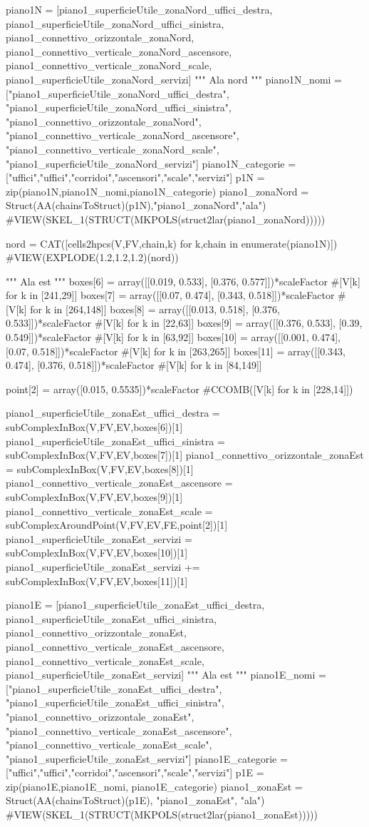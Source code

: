 piano1N = [piano1_superficieUtile_zonaNord_uffici_destra, piano1_superficieUtile_zonaNord_uffici_sinistra, piano1_connettivo_orizzontale_zonaNord, piano1_connettivo_verticale_zonaNord_ascensore, piano1_connettivo_verticale_zonaNord_scale, piano1_superficieUtile_zonaNord_servizi]
""" Ala nord """
piano1N_nomi = ["piano1_superficieUtile_zonaNord_uffici_destra", "piano1_superficieUtile_zonaNord_uffici_sinistra", "piano1_connettivo_orizzontale_zonaNord", "piano1_connettivo_verticale_zonaNord_ascensore", "piano1_connettivo_verticale_zonaNord_scale", "piano1_superficieUtile_zonaNord_servizi"]
piano1N_categorie = ["uffici","uffici","corridoi","ascensori","scale","servizi"]
p1N = zip(piano1N,piano1N_nomi,piano1N_categorie)
piano1_zonaNord = Struct(AA(chainsToStruct)(p1N),"piano1_zonaNord","ala")
#VIEW(SKEL_1(STRUCT(MKPOLS(struct2lar(piano1_zonaNord)))))
    
nord = CAT([cells2hpcs(V,FV,chain,k) for k,chain in enumerate(piano1N)])
#VIEW(EXPLODE(1.2,1.2,1.2)(nord))

""" Ala est """
boxes[6] = array([[0.019, 0.533], [0.376, 0.577]])*scaleFactor #[V[k] for k in [241,29]]
boxes[7] = array([[0.07, 0.474], [0.343, 0.518]])*scaleFactor #[V[k] for k in [264,148]]
boxes[8] = array([[0.013, 0.518], [0.376, 0.533]])*scaleFactor #[V[k] for k in [22,63]]
boxes[9] = array([[0.376, 0.533], [0.39, 0.549]])*scaleFactor #[V[k] for k in [63,92]]
boxes[10] = array([[0.001, 0.474], [0.07, 0.518]])*scaleFactor #[V[k] for k in [263,265]]
boxes[11] = array([[0.343, 0.474], [0.376, 0.518]])*scaleFactor #[V[k] for k in [84,149]]

point[2] = array([0.015, 0.5535])*scaleFactor #CCOMB([V[k] for k in [228,14]])

piano1_superficieUtile_zonaEst_uffici_destra = subComplexInBox(V,FV,EV,boxes[6])[1]
piano1_superficieUtile_zonaEst_uffici_sinistra = subComplexInBox(V,FV,EV,boxes[7])[1]
piano1_connettivo_orizzontale_zonaEst = subComplexInBox(V,FV,EV,boxes[8])[1]
piano1_connettivo_verticale_zonaEst_ascensore = subComplexInBox(V,FV,EV,boxes[9])[1]
piano1_connettivo_verticale_zonaEst_scale = subComplexAroundPoint(V,FV,EV,FE,point[2])[1]
piano1_superficieUtile_zonaEst_servizi = subComplexInBox(V,FV,EV,boxes[10])[1]
piano1_superficieUtile_zonaEst_servizi += subComplexInBox(V,FV,EV,boxes[11])[1]

piano1E = [piano1_superficieUtile_zonaEst_uffici_destra, piano1_superficieUtile_zonaEst_uffici_sinistra, piano1_connettivo_orizzontale_zonaEst, piano1_connettivo_verticale_zonaEst_ascensore, piano1_connettivo_verticale_zonaEst_scale, piano1_superficieUtile_zonaEst_servizi]
""" Ala est """
piano1E_nomi = ["piano1_superficieUtile_zonaEst_uffici_destra", "piano1_superficieUtile_zonaEst_uffici_sinistra", "piano1_connettivo_orizzontale_zonaEst", "piano1_connettivo_verticale_zonaEst_ascensore", "piano1_connettivo_verticale_zonaEst_scale", "piano1_superficieUtile_zonaEst_servizi"]
piano1E_categorie = ["uffici","uffici","corridoi","ascensori","scale","servizi"]
p1E = zip(piano1E,piano1E_nomi, piano1E_categorie)
piano1_zonaEst = Struct(AA(chainsToStruct)(p1E), "piano1_zonaEst", "ala")
#VIEW(SKEL_1(STRUCT(MKPOLS(struct2lar(piano1_zonaEst)))))

